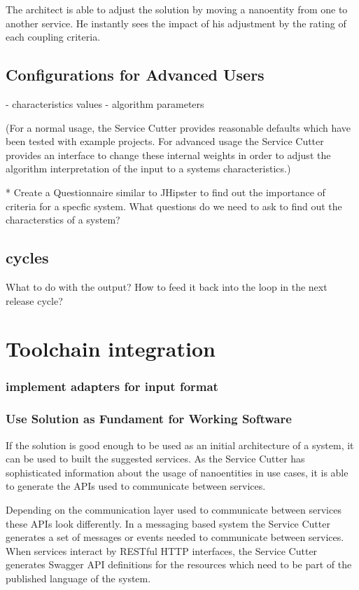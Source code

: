 The architect is able to adjust the solution by moving a nanoentity from one to another service. He instantly sees the impact of his adjustment by the rating of each coupling criteria.


\subsection{Configurations for Advanced Users}

- characteristics values
- algorithm parameters

(For a normal usage, the Service Cutter provides reasonable defaults which have been tested with example projects. For advanced usage the Service Cutter provides an interface to change these internal weights in order to adjust the algorithm interpretation of the input to a systems characteristics.) 


* Create a Questionnaire similar to JHipster to find out the importance of criteria for a specfic system. What questions do we need to ask to find out the characterstics of a system? 

\subsection{cycles}

What to do with the output? How to feed it back into the loop in the next release cycle?

\section{Toolchain integration}

\subsubsection{implement adapters for input format}

\subsubsection{Use Solution as Fundament for Working Software}

If the solution is good enough to be used as an initial architecture of a system, it can be used to built the suggested services. As the Service Cutter has sophisticated information about the usage of nanoentities in use cases, it is able to generate the APIs used to communicate between services. 

Depending on the communication layer used to communicate between services these APIs look differently. In a messaging based system the Service Cutter generates a set of messages or events needed to communicate between services. When services interact by RESTful HTTP interfaces, the Service Cutter generates Swagger\cite{swagger} API definitions for the resources which need to be part of the published language\cite[p.375]{evans2003domain} of the system. 


